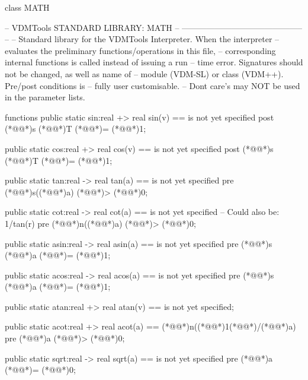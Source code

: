\documentclass[a4paper]{article}
\begin{document}
\title{}
\author{}
\begin{vdm_al}
class MATH

--  VDMTools STANDARD LIBRARY: MATH
--      --------------------------------------------
-- 
-- Standard library for the VDMTools Interpreter. When the interpreter
-- evaluates the preliminary functions/operations in this file,
-- corresponding internal functions is called instead of issuing a run
-- time error. Signatures should not be changed, as well as name of
-- module (VDM-SL) or class (VDM++). Pre/post conditions is 
-- fully user customisable. 
-- Dont care's may NOT be used in the parameter lists.

  functions
public static
    sin:real +> real
    sin(v) ==
    is not yet specified    
    post (*@@*)s (*@@*)T (*@\vdmnotcovered{<}@*)= (*@\vdmnotcovered{}@*)1;

public static
    cos:real +> real
    cos(v) ==
    is not yet specified
    post (*@@*)s (*@@*)T (*@\vdmnotcovered{<}@*)= (*@\vdmnotcovered{}@*)1;

public static
    tan:real -> real
    tan(a) ==
    is not yet specified
    pre (*@@*)s((*@\vdmnotcovered{}@*)a) (*@\vdmnotcovered{<}@*)> (*@\vdmnotcovered{}@*)0;

public static
    cot:real -> real 
    cot(a) ==
    is not yet specified -- Could also be: 1/tan(r)
    pre (*@@*)n((*@\vdmnotcovered{}@*)a) (*@\vdmnotcovered{<}@*)> (*@\vdmnotcovered{}@*)0;

public static
    asin:real -> real
    asin(a) ==
    is not yet specified
    pre (*@@*)s (*@\vdmnotcovered{}@*)a (*@\vdmnotcovered{<}@*)= (*@\vdmnotcovered{}@*)1;

public static
    acos:real -> real
    acos(a) ==
    is not yet specified
    pre (*@@*)s (*@\vdmnotcovered{}@*)a (*@\vdmnotcovered{<}@*)= (*@\vdmnotcovered{}@*)1;

public static
    atan:real +> real
    atan(v) ==
    is not yet specified;

public static
    acot:real +> real
    acot(a) ==
    (*@@*)n((*@\vdmnotcovered{}@*)1(*@\vdmnotcovered{}@*)/(*@\vdmnotcovered{}@*)a)
    pre (*@\vdmnotcovered{}@*)a (*@\vdmnotcovered{<}@*)> (*@\vdmnotcovered{}@*)0;

public static
    sqrt:real -> real
    sqrt(a) ==
    is not yet specified
    pre (*@\vdmnotcovered{}@*)a (*@\vdmnotcovered{>}@*)= (*@\vdmnotcovered{}@*)0;


\end{vdm_al}
\end{document}
